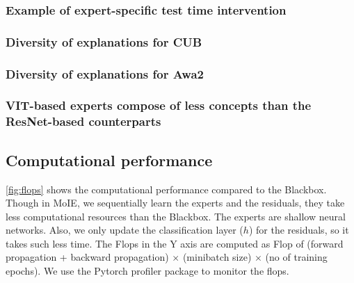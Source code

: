 \documentclass[nohyperref]{article}
\theoremstyle{plain}
\theoremstyle{definition}
\theoremstyle{remark}
\begin{document}
% 

% 

% 

\subsubsection{Example of expert-specific test time intervention}
\label{app:tti_qual}


\subsubsection{Diversity of explanations for CUB}
\label{app:local_cub}



\subsubsection{Diversity of explanations for Awa2}
\label{app:local_awa2}


\subsubsection{VIT-based experts compose of less concepts than the ResNet-based counterparts}
\label{app:comparison_arch}


\subsection{Computational performance }
\label{app:validate_concepts}
\cref{fig:flops} shows the computational performance compared to the Blackbox. Though in MoIE, we sequentially learn the experts and the residuals, they take less computational resources than the Blackbox. The experts are shallow neural networks. Also, we only update the classification layer ($h$) for the residuals, so it takes such less time. The Flops in the Y axis are computed as Flop of (forward propagation + backward propagation) $\times$ (minibatch size) $\times$ (no of training epochs).
We use the Pytorch profiler package to monitor the flops.
\end{document}
